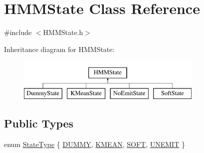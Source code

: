 \hypertarget{class_h_m_m_state}{\section{H\+M\+M\+State Class Reference}
\label{class_h_m_m_state}
}


{\ttfamily \#include $<$H\+M\+M\+State.\+h$>$}

Inheritance diagram for H\+M\+M\+State\+:\begin{figure}[H]
\begin{center}
\leavevmode
\includegraphics[height=2.000000cm]{class_h_m_m_state}
\end{center}
\end{figure}
\subsection*{Public Types}
\begin{DoxyCompactItemize}
\item 
enum \hyperlink{class_h_m_m_state_a35d2a059c2410a52110329b637940046}{State\+Type} \{ \hyperlink{class_h_m_m_state_a35d2a059c2410a52110329b637940046a44d3daf65ad0a10c73a516206a560674}{D\+U\+M\+M\+Y}, 
\hyperlink{class_h_m_m_state_a35d2a059c2410a52110329b637940046a8d417cf0b48847cc5bff7f61bf3e5d05}{K\+M\+E\+A\+N}, 
\hyperlink{class_h_m_m_state_a35d2a059c2410a52110329b637940046a2ac5e5594010c11b84fea15cc984b3aa}{S\+O\+F\+T}, 
\hyperlink{class_h_m_m_state_a35d2a059c2410a52110329b637940046aa8661e1ac291d403c548214337b3bcab}{U\+N\+E\+M\+I\+T}
 \}
\end{DoxyCompactItemize}
